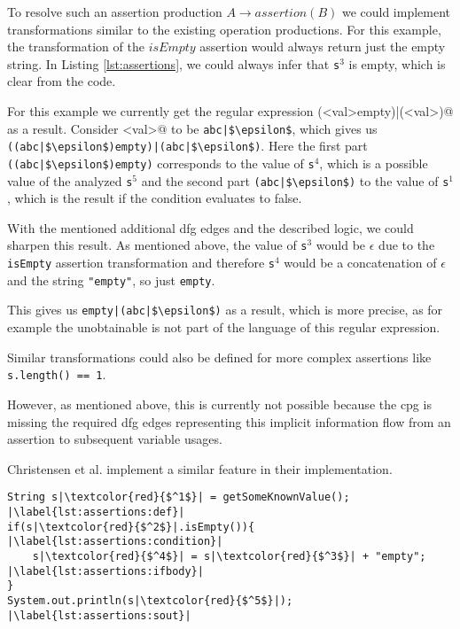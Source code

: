To resolve such an assertion production $A \rightarrow assertion(B)$ we could implement transformations similar to the existing operation productions. For this example, the transformation of the $isEmpty$ assertion would always return just the empty string.
In Listing \ref{lst:assertions}, we could always infer that \lstinline|s|$^3$ is empty, which is clear from the code.

For this example we currently get the regular expression \Verb@(<val>empty)|(<val>)@ as a result. 
Consider \Verb@<val>@ to be \lstinline[mathescape]@abc|$\epsilon$@, which gives us \lstinline[mathescape]@((abc|$\epsilon$)empty)|(abc|$\epsilon$)@.
Here the first part \lstinline[mathescape]@((abc|$\epsilon$)empty)@ corresponds to the value of \lstinline|s|$^4$, which is a possible value of the analyzed \lstinline|s|$^5$ and the second part \lstinline[mathescape]@(abc|$\epsilon$)@ to the value of \lstinline|s|$^1$, which is the result if the condition evaluates to false.

With the mentioned additional \ac{dfg} edges and the described logic, we could sharpen this result.
As mentioned above, the value of \lstinline|s|$^3$ would be $\epsilon$ due to the \lstinline|isEmpty| assertion transformation and therefore \lstinline|s|$^4$ would be a concatenation of $\epsilon$ and the string \lstinline|"empty"|, so just \lstinline|empty|.

This gives us \lstinline[mathescape]@empty|(abc|$\epsilon$)@ as a result, which is more precise, as for example the unobtainable \Verb@abcempty@ is not part of the language of this regular expression.

Similar transformations could also be defined for more complex assertions like \lstinline|s.length() == 1|.

However, as mentioned above, this is currently not possible because the \ac{cpg} is missing the required \ac{dfg} edges representing this implicit information flow from an assertion to subsequent variable usages. 

Christensen et al. implement a similar feature in their implementation.

\begin{lstlisting}[caption={Assertion Example}, label=lst:assertions, captionpos=b, float, numbers=right, escapechar=|]
String s|\textcolor{red}{$^1$}| = getSomeKnownValue(); |\label{lst:assertions:def}|
if(s|\textcolor{red}{$^2$}|.isEmpty()){ |\label{lst:assertions:condition}|
	s|\textcolor{red}{$^4$}| = s|\textcolor{red}{$^3$}| + "empty"; |\label{lst:assertions:ifbody}|
}
System.out.println(s|\textcolor{red}{$^5$}|); |\label{lst:assertions:sout}|
\end{lstlisting}

